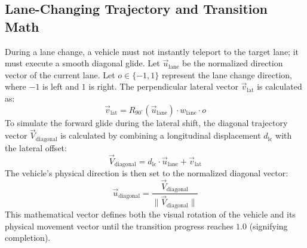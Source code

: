 \documentclass[../report_main.tex]{subfiles}
\begin{document}
\subsection{Lane-Changing Trajectory and Transition Math}
During a lane change, a vehicle must not instantly teleport to the target lane; it must execute a smooth diagonal glide. Let $\overrightarrow{u}_{\text{lane}}$ be the normalized direction vector of the current lane. Let $o \in \{-1, 1\}$ represent the lane change direction, where $-1$ is left and $1$ is right.
The perpendicular lateral vector $\overrightarrow{v}_{\text{lat}}$ is calculated as:
\begin{equation}
    \overrightarrow{v}_{\text{lat}} = R_{90^\circ}(\overrightarrow{u}_{\text{lane}}) \cdot w_{\text{lane}} \cdot o
\end{equation}
To simulate the forward glide during the lateral shift, the diagonal trajectory vector $\overrightarrow{V}_{\text{diagonal}}$ is calculated by combining a longitudinal displacement $d_{\text{lc}}$ with the lateral offset:
\begin{equation}
    \overrightarrow{V}_{\text{diagonal}} = d_{\text{lc}} \cdot \overrightarrow{u}_{\text{lane}} + \overrightarrow{v}_{\text{lat}}
\end{equation}
The vehicle's physical direction is then set to the normalized diagonal vector:
\begin{equation}
    \overrightarrow{u}_{\text{diagonal}} = \frac{\overrightarrow{V}_{\text{diagonal}}}{\|\overrightarrow{V}_{\text{diagonal}}\|}
\end{equation}
This mathematical vector defines both the visual rotation of the vehicle and its physical movement vector until the transition progress reaches $1.0$ (signifying completion).
\end{document}
